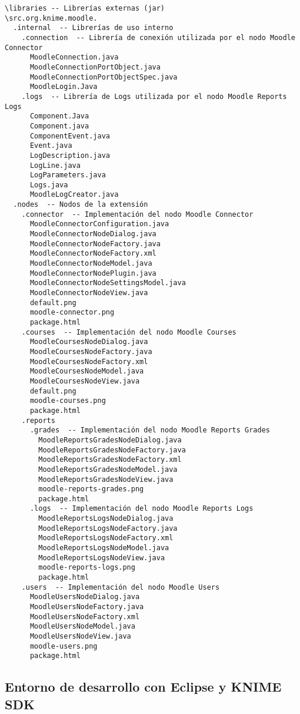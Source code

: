 \begin{verbatim} 
\libraries -- Librerías externas (jar)
\src.org.knime.moodle.
  .internal  -- Librerías de uso interno
    .connection  -- Librería de conexión utilizada por el nodo Moodle Connector
      MoodleConnection.java
      MoodleConnectionPortObject.java
      MoodleConnectionPortObjectSpec.java
      MoodleLogin.Java
    .logs  -- Librería de Logs utilizada por el nodo Moodle Reports Logs
      Component.Java
      Component.java
      ComponentEvent.java
      Event.java
      LogDescription.java
      LogLine.java
      LogParameters.java
      Logs.java
      MoodleLogCreator.java
  .nodes  -- Nodos de la extensión
    .connector  -- Implementación del nodo Moodle Connector
      MoodleConnectorConfiguration.java
      MoodleConnectorNodeDialog.java
      MoodleConnectorNodeFactory.java
      MoodleConnectorNodeFactory.xml
      MoodleConnectorNodeModel.java
      MoodleConnectorNodePlugin.java
      MoodleConnectorNodeSettingsModel.java
      MoodleConnectorNodeView.java
      default.png
      moodle-connector.png
      package.html
    .courses  -- Implementación del nodo Moodle Courses
      MoodleCoursesNodeDialog.java
      MoodleCoursesNodeFactory.java
      MoodleCoursesNodeFactory.xml
      MoodleCoursesNodeModel.java
      MoodleCoursesNodeView.java
      default.png
      moodle-courses.png
      package.html
    .reports
      .grades  -- Implementación del nodo Moodle Reports Grades
        MoodleReportsGradesNodeDialog.java
        MoodleReportsGradesNodeFactory.java
        MoodleReportsGradesNodeFactory.xml
        MoodleReportsGradesNodeModel.java
        MoodleReportsGradesNodeView.java
        moodle-reports-grades.png
        package.html
      .logs  -- Implementación del nodo Moodle Reports Logs
        MoodleReportsLogsNodeDialog.java
        MoodleReportsLogsNodeFactory.java
        MoodleReportsLogsNodeFactory.xml
        MoodleReportsLogsNodeModel.java
        MoodleReportsLogsNodeView.java
        moodle-reports-logs.png
        package.html
    .users  -- Implementación del nodo Moodle Users
      MoodleUsersNodeDialog.java
      MoodleUsersNodeFactory.java
      MoodleUsersNodeFactory.xml
      MoodleUsersNodeModel.java
      MoodleUsersNodeView.java
      moodle-users.png
      package.html
\end{verbatim}



\subsection{Entorno de desarrollo con Eclipse y KNIME SDK}

